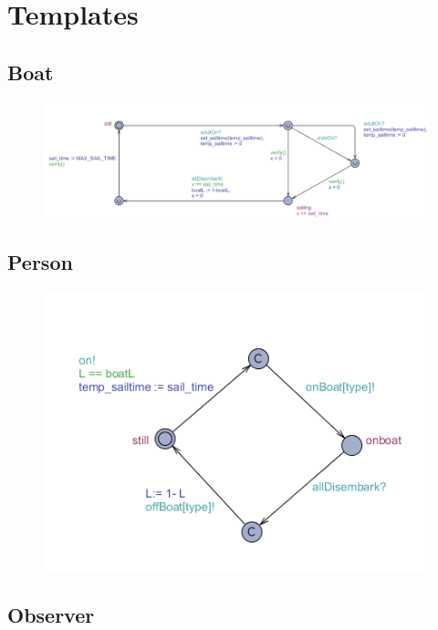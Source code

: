 \chapter{Templates}




\section{Boat}

\begin{figure}%
\includegraphics[width=\columnwidth]{pictures/boat.png}%
\caption{}%
\label{}%
\end{figure}






\section{Person}
\begin{figure}%
\includegraphics[width=\columnwidth]{pictures/person.png}%
\caption{}%
\label{}%
\end{figure}

\section{Observer}

